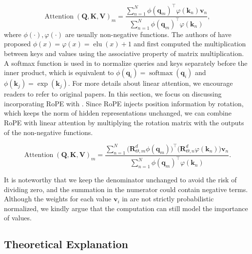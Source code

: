 \documentclass{article}
\def\q{{\boldsymbol q}}
\def\k{{\boldsymbol k}}
\def\v{{\boldsymbol v}}
\def\R{{\boldsymbol R}}
\def\Q{{\boldsymbol Q}}
\def\K{{\boldsymbol K}}
\def\V{{\boldsymbol V}}
\begin{document}
\begin{equation}
	\operatorname{Attention}(\Q,\K,\V)_m=\frac{\sum_{n=1}^{N}\phi(\q_m)^{\intercal}\varphi(\k_n)\v_n}{\sum_{n=1}^{N}\phi(\q_m)^{\intercal}\varphi(\k_n)},
	\label{fn:linear-attention}
\end{equation}
where $\phi(\cdot), \varphi(\cdot)$ are usually non-negative functions. The authors of \cite{katharopoulos2020transformers} have proposed $\phi(x)=\varphi(x)=\operatorname{elu}(x)+1$ and first computed the multiplication between keys and values using the associative property of matrix multiplication.  A softmax function is used in \cite{shen2021efficient} to normalize queries and keys separately before the inner product, which is equivalent to   $\phi(\q_i)=\operatorname{softmax}(\q_i)$ and $\phi(\k_j)=\exp(\k_j)$. For more details about linear attention, we encourage readers to refer to original papers. In this section, we focus on discussing incorporating RoPE with . Since RoPE injects position information by rotation, which keeps the norm of hidden representations unchanged, we can combine RoPE with linear attention by multiplying the rotation matrix with the outputs of the non-negative functions.

\begin{equation}
	\operatorname{Attention}(\mathbf{Q},\mathbf{K},\mathbf{V})_m=\frac{\sum_{n=1}^{N}\big(\R^d_{\Theta, m}\phi(\q_m)\big)^{\intercal}\big(\R^d_{\Theta, n}\varphi(\k_n)\big)\v_n}{\sum_{n=1}^{N}\phi(\q_m)^{\intercal}\varphi(\k_n)}.
	\label{fn:linear-rope}
\end{equation}

It is noteworthy that we keep the denominator unchanged to avoid the risk of dividing zero, and the summation in the numerator could contain negative terms. Although the weights for each value $\v_i$ in   are not strictly probabilistic normalized, we kindly argue that the computation can still model the importance of values. 
\subsection{Theoretical Explanation}
\end{document}

